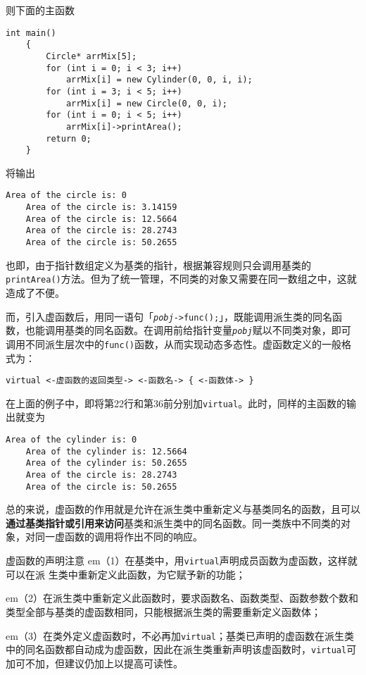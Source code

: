 \documentclass[10pt, a4paper, oneside, fontset=none]{ctexart}
\theoremstyle{plain}
\theoremstyle{definition}
\newcommand{\colors}[1]{\color{#1!75!black}}
\newcommand{\hang}[1][1]{\hangafter 1 \hangindent #1em}
\newcommand{\zhu}[2][]{\begin{note}{#1}\xiu #2\end{note}}
\begin{document}
则下面的主函数
\begin{lstlisting}[firstnumber=40, moreemph={Point, Circle, Cylinder}, emphstyle=\colors{qinglv}, moreemph={[2]{x, y, a, b, os, p, radius, r, c, height, h, arrMix, i}}, emphstyle={[2]\it\ttfamily}]
	int main()
	{
		Circle* arrMix[5];
		for (int i = 0; i < 3; i++)
			arrMix[i] = new Cylinder(0, 0, i, i);
		for (int i = 3; i < 5; i++)
			arrMix[i] = new Circle(0, 0, i);
		for (int i = 0; i < 5; i++)
			arrMix[i]->printArea();
		return 0;
	}
\end{lstlisting}
将输出
\begin{lstlisting}[style=output]
	Area of the circle is: 0
	Area of the circle is: 3.14159
	Area of the circle is: 12.5664
	Area of the circle is: 28.2743
	Area of the circle is: 50.2655
\end{lstlisting}
也即，由于指针数组定义为基类的指针，根据兼容规则只会调用基类的\texttt{printArea()}方法。但为了统一管理，不同类的对象又需要在同一数组之中，这就造成了不便。

而，引入虚函数后，用同一语句「\texttt{\textit{pobj}->func();}」，既能调用派生类的同名函数，也能调用基类的同名函数。在调用前给指针变量\texttt{\textit{pobj}}赋以不同类对象，即可调用不同派生层次中的\texttt{func()}函数，从而实现动态多态性。虚函数定义的一般格式为：
\begin{lstlisting}[style=intro]
	virtual <-虚函数的返回类型-> <-函数名-> { <-函数体-> }
\end{lstlisting}
在上面的例子中，即将第22行和第36前分别加\texttt{virtual}。此时，同样的主函数的输出就变为
\begin{lstlisting}[style=output]
	Area of the cylinder is: 0
	Area of the cylinder is: 12.5664
	Area of the cylinder is: 50.2655
	Area of the circle is: 28.2743
	Area of the circle is: 50.2655
\end{lstlisting}

总的来说，虚函数的作用就是允许在派生类中重新定义与基类同名的函数，且可以\textbf{通过基类指针或引用来访问}基类和派生类中的同名函数。同一类族中不同类的对象，对同一虚函数的调用将作出不同的响应。

\zhu[虚函数的声明注意]{
	\hang[2]（1）在基类中，用\texttt{virtual}声明成员函数为虚函数，这样就可以在派
	生类中重新定义此函数，为它赋予新的功能；

	\hang[2]（2）在派生类中重新定义此函数时，要求函数名、函数类型、函数参数个数和类型全部与基类的虚函数相同，只能根据派生类的需要重新定义函数体；

	\hang[2]（3）在类外定义虚函数时，不必再加\texttt{virtual}；基类已声明的虚函数在派生类中的同名函数都自动成为虚函数，因此在派生类重新声明该虚函数时，\texttt{virtual}可加可不加，但建议仍加上以提高可读性。
}
\end{document}

